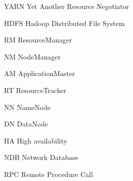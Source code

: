 \begin{basedescript}{\desclabelstyle{\pushlabel}\desclabelwidth{10em}}
\item[YARN] Yet Another Resource Negotiator
  \cite{Vavilapalli:2013:AHY:2523616.2523633}
\item[HDFS] Hadoop Distributed File System \cite{hdfs}
\item[RM] ResourceManager
\item[NM] NodeManager
\item[AM] ApplicationMaster
\item[RT] ResourceTracker
\item[NN] NameNode
\item[DN] DataNode
\item[HA] High availability
\item[NDB] Network Database
\item[RPC] Remote Procedure Call
\end{basedescript}